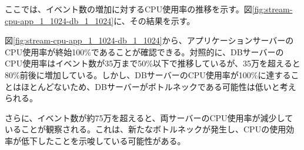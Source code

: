 \documentclass[../../../../../../main]{subfiles}
\begin{document}
    \label{subsubsubsec:result-chunk-only-limit-cpu}

    ここでは、イベント数の増加に対するCPU使用率の推移を示す。図\ref{fig:stream-cpu-app_1_1024-db_1_1024}に、その結果を示す。

    

    図\ref{fig:stream-cpu-app_1_1024-db_1_1024}から、アプリケーションサーバーのCPU使用率が終始100\%であることが確認できる。対照的に、DBサーバーのCPU使用率はイベント数が35万まで50\%以下で推移しているが、35万を超えると80\%前後に増加している。しかし、DBサーバーのCPU使用率が100\%に達することはほとんどないため、DBサーバーがボトルネックである可能性は低いと考えられる。

    さらに、イベント数が約75万を超えると、両サーバーのCPU使用率が減少していることが観察される。これは、新たなボトルネックが発生し、CPUの使用効率が低下したことを示唆している可能性がある。
\end{document}

